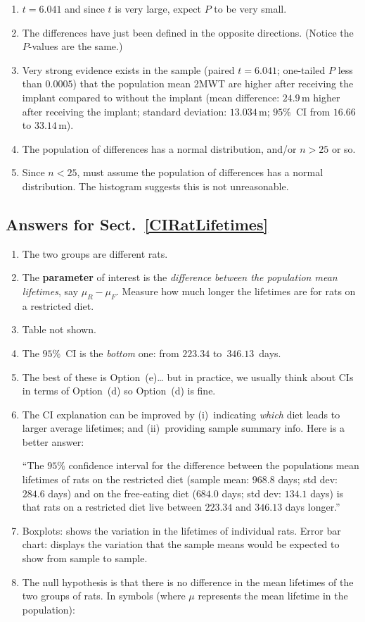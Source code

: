 \documentclass[
  11pt,
  a4paper,
  krantz2]{krantz}
\providecommand{\tightlist}{%
  \setlength{\itemsep}{0pt}\setlength{\parskip}{0pt}}
\begin{document}
\begin{footnotesize}
\begin{enumerate}
\item
  \(t = 6.041\) and since \(t\) is very large, expect \(P\) to be very small.
\item
  The differences have just been defined in the opposite directions.
  (Notice the \(P\)-values are the same.)
\item
  Very strong evidence exists in the sample (paired \(t = 6.041\); one-tailed \(P\) less than \(0.0005\)) that the population mean 2MWT are higher after receiving the implant compared to without the implant (mean difference: \(24.9\,\text{m}\) higher after receiving the implant; standard deviation: \(13.034\,\text{m}\); \(95\)\%~CI from \(16.66\) to \(33.14\,\text{m}\)).
\item
  The population of differences has a normal distribution, and/or \(n > 25\) or so.
\item
  Since \(n < 25\), must assume the population of differences has a normal distribution.
  The histogram suggests this is not unreasonable.
\end{enumerate}

\subsection*{Answers for Sect.~\ref{CIRatLifetimes}}\label{answers-for-sect.-refciratlifetimes}

\begin{enumerate}
\def\labelenumi{\arabic{enumi}.}
\item
  The two groups are different rats. \tightlist
\item
  The \textbf{parameter} of interest is the \emph{difference between the population mean lifetimes}, say \(\mu_R - \mu_F\).
  Measure how much longer the lifetimes are for rats on a restricted diet.
\item
  Table not shown.
\item
  The \(95\)\%~CI is the \emph{bottom} one: from \(223.34\) to~\(346.13\)~days.
\item
  The best of these is Option~(e)\ldots{} but in practice, we usually think about CIs in terms of Option~(d) so Option~(d) is fine.
\item
  The CI explanation can be improved by (i)~indicating \emph{which} diet leads to larger average lifetimes; and (ii)~providing sample summary info. Here is a better answer:

  ``The \(95\)\% confidence interval for the difference between the populations mean lifetimes of rats on the restricted diet (sample mean: \(968.8\) days; std dev: \(284.6\) days) and on the free-eating diet (\(684.0\) days; std dev: \(134.1\) days) is that rats on a restricted diet live between \(223.34\) and \(346.13\) days longer.''
\item
  Boxplots: shows the variation in the lifetimes of individual rats.
  Error bar chart: displays the variation that the sample means would be expected to show from sample to sample.
\item
  The null hypothesis is that there is no difference in the mean lifetimes of the two groups of rats.
  In symbols (where \(\mu\) represents the mean lifetime in the population):


\end{enumerate}
\end{footnotesize}
\end{document}
